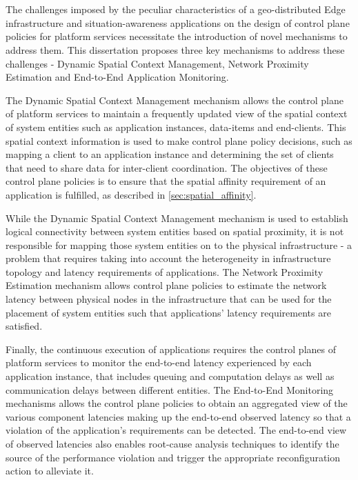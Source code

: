 \chapter{
}
\label{sec:mechanisms}

The challenges imposed by the peculiar characteristics of a geo-distributed Edge infrastructure and situation-awareness applications on the design of control plane policies for platform services necessitate the introduction of novel mechanisms to address them. This dissertation proposes three key mechanisms to address these challenges - Dynamic Spatial Context Management, Network Proximity Estimation and End-to-End Application Monitoring. 
\par The Dynamic Spatial Context Management mechanism allows the control plane of platform services to maintain a frequently updated view of the spatial context of system entities such as application instances, data-items and end-clients. This spatial context information is used to make control plane policy decisions, such as mapping a client to an application instance and determining the set of clients that need to share data for inter-client coordination. The objectives of these control plane policies is to ensure that the spatial affinity requirement of an application is fulfilled, as described in \cref{sec:spatial_affinity}.
\par While the Dynamic Spatial Context Management mechanism is used to establish logical connectivity between system entities based on spatial proximity, it is not responsible for mapping those system entities on to the physical infrastructure - a problem that requires taking into account the  heterogeneity in infrastructure topology and latency requirements of applications. The Network Proximity Estimation mechanism allows control plane policies to estimate the network latency between physical nodes in the infrastructure that can be used for the placement of system entities such that applications' latency requirements are satisfied. 
\par Finally, the continuous execution of applications requires the control planes of platform services to monitor the end-to-end latency experienced by each application instance, that includes queuing and computation delays as well as communication delays between different entities. The End-to-End Monitoring mechanisms allows the control plane policies to obtain an aggregated view of the various component latencies making up the end-to-end observed latency so that a violation of the application's requirements can be detected. The end-to-end view of observed latencies also enables root-cause analysis techniques to identify the source of the performance violation and trigger the appropriate reconfiguration action to alleviate it. 
